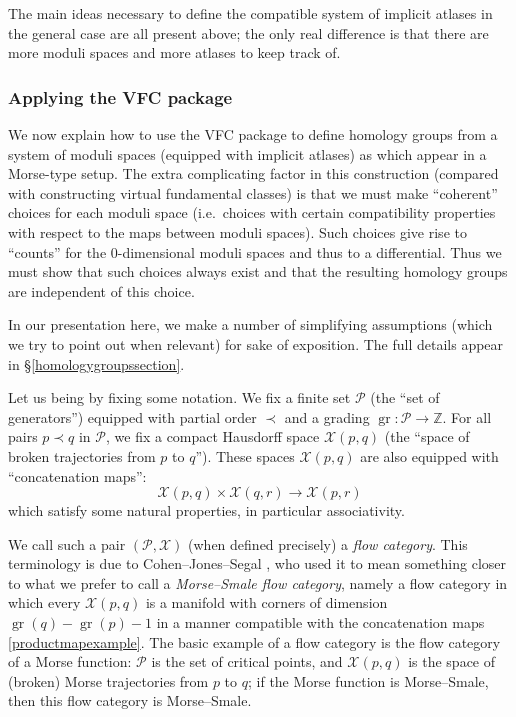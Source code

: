 \documentclass[12pt]{article}
\theoremstyle{definition}
\theoremstyle{remark}
\numberwithin{equation}{subsection}
\newcommand{\X}{\mathcal X}
\newcommand{\ZZ}{\mathbb Z}
\newcommand{\PPP}{\mathcal P}
\newcommand{\gr}{\operatorname{gr}}
\begin{document}
The main ideas necessary to define the compatible system of implicit atlases in the general case are all present above; the only real difference is that there are more moduli spaces and more atlases to keep track of.

\subsubsection{Applying the VFC package}\label{floerintroVFC}

We now explain how to use the VFC package to define homology groups from a system of moduli spaces (equipped with implicit atlases) as which appear in a Morse-type setup.  The extra complicating factor in this construction (compared with constructing virtual fundamental classes) is that we must make ``coherent'' choices for each moduli space (i.e.\ choices with certain compatibility properties with respect to the maps between moduli spaces).  Such choices give rise to ``counts'' for the $0$-dimensional moduli spaces and thus to a differential.  Thus we must show that such choices always exist and that the resulting homology groups are independent of this choice.

In our presentation here, we make a number of simplifying assumptions (which we try to point out when relevant) for sake of exposition.  The full details appear in \S\ref{homologygroupssection}.

Let us being by fixing some notation.  We fix a finite set $\PPP$ (the ``set of generators'') equipped with partial order $\prec$ and a grading $\gr:\PPP\to\ZZ$.  For all pairs $p\prec q$ in $\PPP$, we fix a compact Hausdorff space $\X(p,q)$ (the ``space of broken trajectories from $p$ to $q$'').  These spaces $\X(p,q)$ are also equipped with ``concatenation maps'':
\begin{equation}\label{productmapexample}
\X(p,q)\times\X(q,r)\to\X(p,r)
\end{equation}
which satisfy some natural properties, in particular associativity.

We call such a pair $(\PPP,\X)$ (when defined precisely) a \emph{flow category}.  This terminology is due to Cohen--Jones--Segal \cite{cohenjonessegal}, who used it to mean something closer to what we prefer to call a \emph{Morse--Smale flow category}, namely a flow category in which every $\X(p,q)$ is a manifold with corners of dimension $\gr(q)-\gr(p)-1$ in a manner compatible with the concatenation maps \eqref{productmapexample}.  The basic example of a flow category is the flow category of a Morse function: $\PPP$ is the set of critical points, and $\X(p,q)$ is the space of (broken) Morse trajectories from $p$ to $q$; if the Morse function is Morse--Smale, then this flow category is Morse--Smale.
\end{document}

